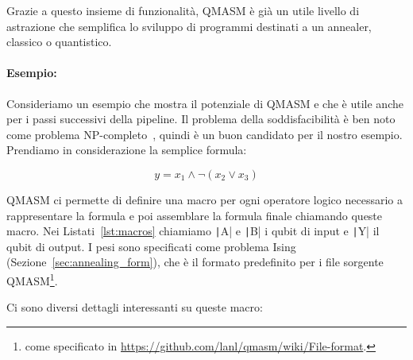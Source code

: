 Grazie a questo insieme di funzionalità, QMASM è già un utile livello di astrazione che semplifica lo sviluppo di programmi destinati a un annealer, classico o quantistico.

\paragraph{Esempio:} Consideriamo un esempio che mostra il potenziale di QMASM e che è utile anche per i passi successivi della pipeline. Il problema della soddisfacibilità è ben noto come problema NP-completo~\cite{garey2002computers}, quindi è un buon candidato per il nostro esempio. Prendiamo in considerazione la semplice formula:

\begin{equation}
	y = x_1 \land \neg(x_2 \lor x_3)
	\label{eqn:simple_logic}
\end{equation}

QMASM ci permette di definire una macro per ogni operatore logico necessario a rappresentare la formula e poi assemblare la formula finale chiamando queste macro. Nei Listati~\ref{lst:macros} chiamiamo \texttt|A| e \texttt|B| i qubit di input e \texttt|Y| il qubit di output. I pesi sono specificati come problema Ising (Sezione~\ref{sec:annealing_form}), che è il formato predefinito per i file sorgente QMASM\footnote{come specificato in \url{https://github.com/lanl/qmasm/wiki/File-format}.}.

Ci sono diversi dettagli interessanti su queste macro:

